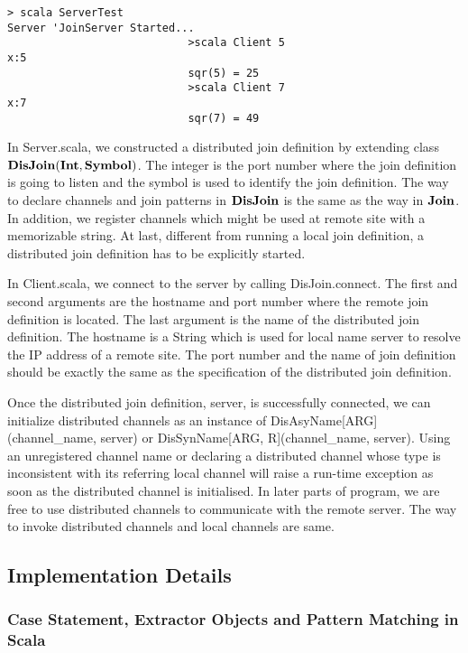 \begin{lstlisting}
> scala ServerTest                                    
Server 'JoinServer Started...
							>scala Client 5
x:5
							sqr(5) = 25
							>scala Client 7
x:7
							sqr(7) = 49
\end{lstlisting}


In Server.scala, we constructed a distributed join definition by extending class \\ $\bf{DisJoin(Int, Symbol)}$.  The integer is the port number where the join definition is going to listen and the symbol is used to identify the join definition.  The way to declare channels and join patterns in $\bf{DisJoin}$ is the same as the way in $\bf{Join}$.  In addition, we register channels which might be used at remote site with a memorizable string.  At last, different from running a local join definition, a distributed join definition has to be explicitly started.

In Client.scala, we connect to the server by calling DisJoin.connect.  The first and second arguments are the hostname and port number where the remote join definition is located.  The last argument is the name of the distributed join definition.  The hostname is a String which is used for local name server to resolve the IP address of a remote site.  The port number and the name of join definition should be exactly the same as the specification of the distributed join definition.

Once the distributed join definition, server, is successfully connected, we can initialize distributed channels as an instance of DisAsyName[ARG](channel\_name, server) or DisSynName[ARG, R](channel\_name, server).  Using an unregistered channel name or declaring a distributed channel whose type is inconsistent with  its referring local channel will raise a run-time exception as soon as the distributed channel is initialised.  In later parts of program, we are free to use distributed channels to communicate with the remote server.  The way to invoke distributed channels and local channels are same.



\newpage

\subsection{Implementation Details}
\subsubsection{Case Statement, Extractor Objects and Pattern Matching in Scala}

